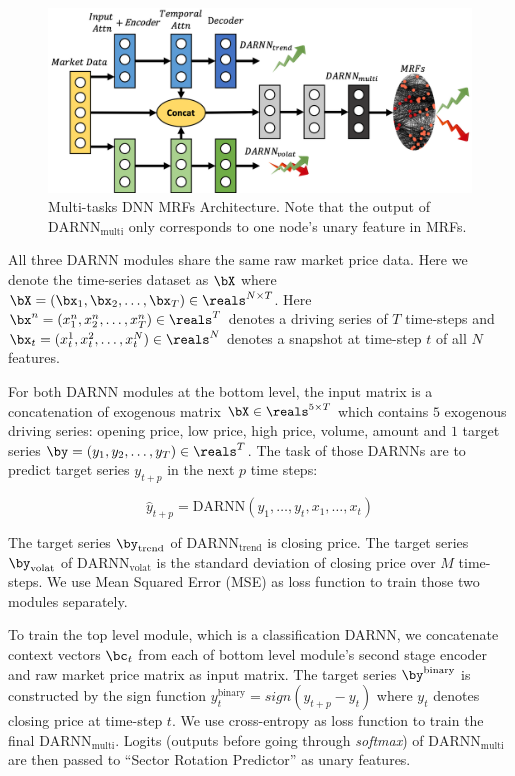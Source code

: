 \documentclass[sigconf]{acmart}
\begin{document}
\begin{figure}[t]
  \centering
  \includegraphics[width=1\columnwidth]{Methodology/figures/hmplmrf.png}
  \caption{\label{fig:mrfrnn} Multi-tasks DNN MRFs Architecture. Note 
  that the output of $\text{DARNN}_{\text{multi}}$ only corresponds to one 
  node's unary feature in MRFs.}
\end{figure}

All three DARNN modules share the same raw market price data.
Here we denote the time-series dataset as $\bX$ where
$\bX=(\bx_1,\bx_2,\dots,\bx_T)\in \reals^{N\times T}$. Here
$\bx^n=(x_1^n,x_2^n,\dots,x_T^n) \in \reals^T$ denotes a driving
series of $T$ time-steps and $\bx_t=(x_t^1,x_t^2\\ ,\dots
,x_t^N)\in \reals^N$ denotes a snapshot at time-step $t$ of all
$N$ features.

For both DARNN modules at the bottom level, the input matrix is a
concatenation of exogenous matrix $\bX \in \reals^{5\times T}$
which contains $5$ exogenous driving series: opening price, low
price, high price, volume, amount and $1$ target series $\by =
(y_1,y_2,\dots,y_T) \in \reals^T$. The task of those DARNNs are
to predict target series $y_{t+p}$ in the next $p$ time steps:

$$\hat{y}_{t+p} = \text{DARNN}(y_1,\dots,y_{t},x_1,\dots,x_t)$$

The target series $\by_{\text{trend}}$ of
$\text{DARNN}_{\text{trend}}$ is closing price. The target series
$\by_{\text{volat}}$ of $\text{DARNN}_{\text{volat}}$ is the
standard deviation of closing price over $M$ time-steps. We use
Mean Squared Error (MSE) as loss function to train those two
modules separately.

To train the top level module, which is a classification DARNN,
we concatenate context vectors $\bc_t$ from each of bottom level
module's second stage encoder and raw market price matrix as
input matrix. The target series $\by^{\text{binary}}$ is
constructed by the sign function $y_t^{\text{binary}} =
sign(y_{t+p}-y_t)$ where $y_t$ denotes closing price at time-step
$t$. We use cross-entropy as loss function to train the final
$\text{DARNN}_{\text{multi}}$. Logits (outputs before going through
\emph{softmax}) of $\text{DARNN}_{\text{multi}}$ are then passed to 
``Sector Rotation Predictor'' as unary features.
\end{document}
